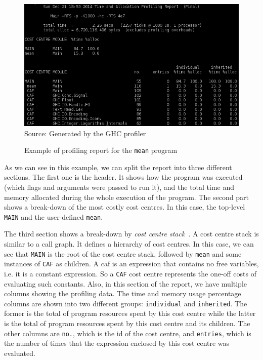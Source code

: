 \begin{figure}[htp]
  \centering
  \caption{Example of profiling report for the \texttt{mean} program}
  \includegraphics[width=\columnwidth]{images/profiler-placeholder}
  \footnotesize{Source: Generated by the GHC profiler}
  \label{fig:profiler-sample}
\end{figure}

As we can see in this example, we can split the report into three different sections. The first one is the header. It shows how the program was executed (which flags and arguments were passed to run it), and the total time and memory allocated during the whole execution of the program. The second part shows a break-down of the most costly cost centres. In this case, the top-level \texttt{MAIN} and the user-defined \texttt{mean}.

The third section shows a break-down by \emph{cost centre stack}~\citep{morgan:1998}. A cost centre stack is similar to a call graph. It defines a hierarchy of cost centres. In this case, we can see that \texttt{MAIN} is the root of the cost centre stack, followed by \texttt{mean} and some instances of \texttt{CAF} as children. A \ac{caf} is an expression that contains no free variables, i.e. it is a constant expression. So a \texttt{CAF} cost centre represents the one-off costs of evaluating such constants. Also, in this section of the report, we have multiple columns showing the profiling data. The time and memory usage percentage columns are shown into two different groups: \texttt{individual} and \texttt{inherited}. The former is the total of program resources spent by this cost centre while the latter is the total of program resources spent by this cost centre and its children. The other columns are \texttt{no.}, which is the id of the cost centre, and \texttt{entries}, which is the number of times that the expression enclosed by this cost centre was evaluated.

